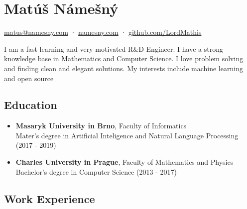 \documentclass[a4,12pt]{article}
\begin{document}
\section*{Matúš Námešný}


\begin{center}
\href{mailto:matus@namesny.com}{matus@namesny.com} · \href{https://namesny.com}{namesny.com} · \href{https://www.github.com/LordMathis}{github.com/LordMathis}
\end{center}

 I am a fast learning and very motivated R\&D Engineer. I have a strong knowledge base in Mathematics and Computer Science. I love problem solving and finding clean and elegant solutions. My interests include machine learning and open source


\subsection*{Education}\label{education}

\begin{itemize}
\item
  \textbf{Masaryk University in Brno}, Faculty of Informatics\\
  Mater's degree in Artificial Inteligence and Natural Language Processing (2017 - 2019)
\item
  \textbf{Charles University in Prague}, Faculty of Mathematics and
  Physics\\
  Bachelor's degree in Computer Science (2013 - 2017)
\end{itemize}

\subsection*{Work Experience}\label{work}
\end{document}
